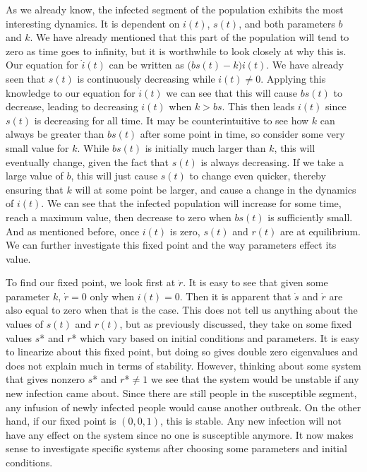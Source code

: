 \documentclass{article}
\begin{document}
As we already know, the infected segment of the population exhibits the most interesting dynamics.  It is dependent on $i(t)$, $s(t)$, and both parameters $b$ and $k$.  We have already mentioned that this part of the population will tend to zero as time goes to infinity, but it is worthwhile to look closely at why this is.  Our equation for $\dot{i}(t)$ can be written as $\big( bs(t)-k \big) i(t)$.  We have already seen that $s(t)$ is continuously decreasing while $i(t) \neq 0$.  Applying this knowledge to our equation for $\dot{i}(t)$ we can see that this will cause $bs(t)$ to decrease, leading to decreasing $i(t)$ when $k>bs$.  This then leads $i(t)$ since $s(t)$ is decreasing for all time.  It may be counterintuitive to see how $k$ can always be greater than $bs(t)$ after some point in time, so consider some very small value for $k$.  While $bs(t)$ is initially much larger than $k$, this will eventually change, given the fact that $s(t)$ is always decreasing.  If we take a large value of $b$, this will just cause $s(t)$ to change even quicker, thereby ensuring that $k$ will at some point be larger, and cause a change in the dynamics of $i(t)$.  We can see that the infected population will increase for some time, reach a maximum value, then decrease to zero when $bs(t)$ is sufficiently small. And as mentioned before, once $i(t)$ is zero, $s(t)$ and $r(t)$ are at equilibrium.  We can further investigate this fixed point and the way parameters effect its value.  

To find our fixed point, we look first at $\dot{r}$.  It is easy to see that given some parameter $k$, $\dot{r}=0$ only when $i(t)=0$.  Then it is apparent that $\dot{s}$ and $\dot{r}$ are also equal to zero when that is the case. This does not tell us anything about the values of $s(t)$ and $r(t)$, but as previously discussed, they take on some fixed values $s$\** and $r$\** which vary based on initial conditions and parameters. It is easy to linearize about this fixed point, but doing so gives double zero eigenvalues and does not explain much in terms of stability.  However, thinking about some system that gives nonzero $s$\** and $r$\**$\neq 1$ we see that the system would be unstable if any new infection came about. Since there are still people in the susceptible segment, any infusion of newly infected people would cause another outbreak. On the other hand, if our fixed point is $(0,0,1)$, this is stable. Any new infection will not have any effect on the system since no one is susceptible anymore.   It now makes sense to investigate specific systems after choosing some parameters and initial conditions.  
\end{document}
